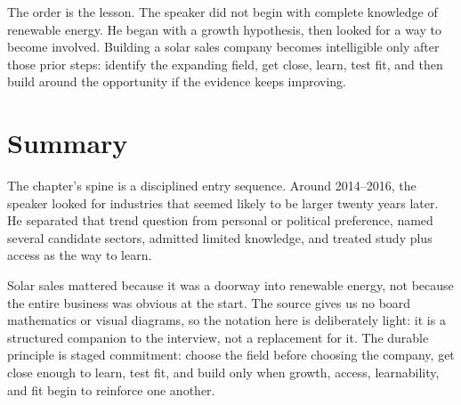 The order is the lesson. The speaker did not begin with complete knowledge of renewable energy. He began with a growth hypothesis, then looked for a way to become involved. Building a solar sales company becomes intelligible only after those prior steps: identify the expanding field, get close, learn, test fit, and then build around the opportunity if the evidence keeps improving.

\section{Summary}

The chapter's spine is a disciplined entry sequence. Around 2014--2016, the speaker looked for industries that seemed likely to be larger twenty years later. He separated that trend question from personal or political preference, named several candidate sectors, admitted limited knowledge, and treated study plus access as the way to learn.

Solar sales mattered because it was a doorway into renewable energy, not because the entire business was obvious at the start. The source gives us no board mathematics or visual diagrams, so the notation here is deliberately light: it is a structured companion to the interview, not a replacement for it. The durable principle is staged commitment: choose the field before choosing the company, get close enough to learn, test fit, and build only when growth, access, learnability, and fit begin to reinforce one another.